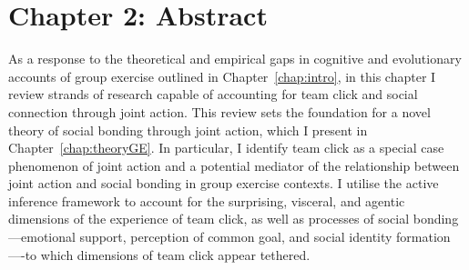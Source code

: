 \chapter*{Chapter 2: Abstract}


As a response to the theoretical and empirical gaps in cognitive and evolutionary accounts of group exercise outlined in Chapter~\ref{chap:intro}, in this chapter I review strands of research capable of accounting for team click and social connection through joint action. This review sets the foundation for a novel theory of social bonding through joint action, which I present in Chapter~\ref{chap:theoryGE}.  In particular, I identify team click as a special case phenomenon of joint action and a potential mediator of the relationship between joint action and social bonding in group exercise contexts.  I utilise the active inference framework to account for the surprising, visceral, and agentic dimensions of the experience of team click, as well as processes of social bonding---emotional support, perception of common goal, and social identity formation----to which dimensions of team click appear tethered.




